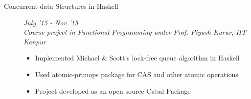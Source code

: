 \documentclass[9pt]{article}
\newenvironment{changemargin}[2]{%
  \begin{list}{}{%
    \setlength{\topsep}{0pt}%
    \setlength{\leftmargin}{#1}%
    \setlength{\rightmargin}{#2}%
    \setlength{\listparindent}{\parindent}%
    \setlength{\itemindent}{\parindent}%
    \setlength{\parsep}{\parskip}%
  }%
  \item[]}{\end{list}
}
\newenvironment{body} {
	\vspace*{-16pt}
	\begin{changemargin}{-0.6in}{-0.65in}
  }	
	{\end{changemargin}
}
\begin{document}
\begin{body}
\begin{description}
	  \item[\normalsize{Concurrent data Structures in Haskell}] \hfill  \textit{July '15 - Nov '15} \\
	  \textit{Course project in Functional Programming under Prof. Piyush Kurur, IIT Kanpur}
	  \begin{itemize}
	   \item Implemented Michael \& Scott's lock-free queue algorithm in Haskell
	   \item Used atomic-primops package for CAS and other atomic operations
	   \item Project developed as an open source Cabal Package
	  \end{itemize}
	


\end{description}
\end{body}
\end{document}
